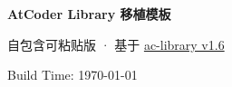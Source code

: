\documentclass{article}
\begin{document}
	\begin{center}
		{\LARGE \textbf{AtCoder Library 移植模板}}

		\vspace{6pt}
		{\small 自包含可粘贴版 · 基于 \href{https://github.com/atcoder/ac-library}{ac-library v1.6}}

		\vspace{4pt}
		{\small Build Time: \today}
	\end{center}

	\vspace{6pt}

	\tableofcontents

	\newpage

	
\end{document}
